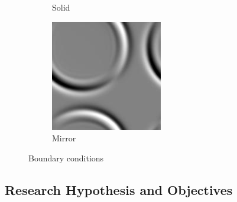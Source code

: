 \documentclass[a4paper,11pt]{article}
\begin{document}
\begin{figure}[ht]
\begin{center}
\begin{minipage}[t]{.38\linewidth}
\begin{subfigure}{.5\textwidth}
  \caption{Solid}
  \label{fig:sub1}
\end{subfigure}%
\begin{subfigure}{.5\textwidth}
  \includegraphics[width=.95\linewidth]{images/mirror.jpg}
  \caption{Mirror}
  \label{fig:sub2}
\end{subfigure}
\caption{Boundary conditions}
\label{fig:boundary}
\end{minipage}
\end{center}

\end{figure}



\subsection{Research Hypothesis and Objectives}


\end{document}
